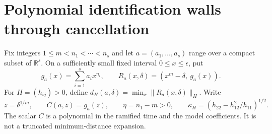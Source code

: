 \documentclass[11pt,reqno]{amsart}
\numberwithin{equation}{section}
\theoremstyle{definition}
\theoremstyle{remark}
\newcommand{\R}{\mathbb R}
\begin{document}
\section{Polynomial identification walls through cancellation}\label{sec:wall}
Fix integers $1\le m<n_1<\cdots<n_s$ and let $a=(a_1,\ldots,a_s)$ range over a compact subset of $\R^s$. On a sufficiently small fixed interval $0\le x\le\epsilon$, put
\[
 g_a(x)=\sum_{i=1}^s a_i x^{n_i},\qquad
 R_a(x,\delta)=(x^m-\delta,\ g_a(x)).
\]
For $H=(h_{ij})>0$, define $d_H(a,\delta)=\min_x\|R_a(x,\delta)\|_H$. Write
\begin{equation}\label{eq:wall-polynomial}
 z=\delta^{1/m},\qquad C(a,z)=g_a(z),\qquad
 \eta=n_1-m>0,\qquad
 \kappa_H=(h_{22}-h_{12}^2/h_{11})^{1/2}.
\end{equation}
The scalar $C$ is a polynomial in the ramified time and the model coefficients. It is not a truncated minimum-distance expansion.
\end{document}
